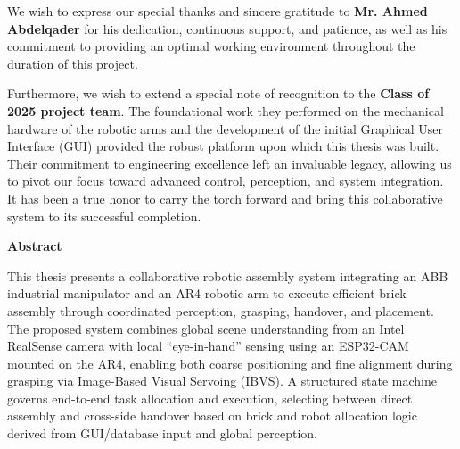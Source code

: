 \documentclass[11pt,a4paper,twoside]{report}
\begin{document}
We wish to express our special thanks and sincere gratitude to \textbf{Mr. Ahmed Abdelqader} for his dedication, continuous support, and patience, as well as his commitment to providing an optimal working environment throughout the duration of this project.

Furthermore, we wish to extend a special note of recognition to the \textbf{Class of 2025 project team}. The foundational work they performed on the mechanical hardware of the robotic arms and the development of the initial Graphical User Interface (GUI) provided the robust platform upon which this thesis was built. Their commitment to engineering excellence left an invaluable legacy, allowing us to pivot our focus toward advanced control, perception, and system integration. It has been a true honor to carry the torch forward and bring this collaborative system to its successful completion.
\clearpage

\vspace*{-2cm} %
\thispagestyle{footeronly}
\begin{center}
    {\Large \textbf{Abstract}} %
\end{center}

\vspace{1cm} %

This thesis presents a collaborative robotic assembly system integrating an ABB industrial manipulator and an AR4 robotic arm to execute efficient brick assembly through coordinated perception, grasping, handover, and placement. The proposed system combines global scene understanding from an Intel RealSense camera with local ``eye-in-hand'' sensing using an ESP32-CAM mounted on the AR4, enabling both coarse positioning and fine alignment during grasping via Image-Based Visual Servoing (IBVS). A structured state machine governs end-to-end task allocation and execution, selecting between direct assembly and cross-side handover based on brick and robot allocation logic derived from GUI/database input and global perception.
\end{document}
